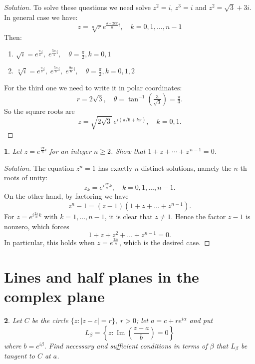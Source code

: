 \documentclass[12pt, a4paper]{report}
\theoremstyle{spaced}
\newtheorem{exercise}{}
\newcommand{\setexercise}[1]{\setcounter{exercise}{#1-1}}
\begin{document}
\begin{proof}[Solution]
	To solve these questions we need solve \(z^2= i\), \(z^3 = i\) and
	\(z^2 = \sqrt{3} + 3i\). In general case we have:
	\[
		z = \sqrt[n]{r}e^{\frac{\theta + 2k\pi}{n}i}, \quad k=0,1,\dots,n-1
	\]
	Then:
	\begin{enumerate}
		\item \(\sqrt{i} = e^{\frac{\pi}{4} i},\; e^{\frac{5\pi}{4} i}, \quad \theta = \frac{\pi}{2}, k = 0, 1\)
		\item \(\sqrt[3]{i} = e^{\frac{\pi}{6} i},\; e^{\frac{5\pi}{6} i},
		      \; e^{\frac{9\pi}{6} i}, \quad \theta = \frac{\pi}{2}, k = 0, 1, 2\)
	\end{enumerate}

	For the third one we need to write it in polar coordinates:
	\[
		r =  2\sqrt{3}, \quad\theta = \tan^{-1}\!\left(\tfrac{3}{\sqrt{3}}\right) = \tfrac{\pi}{3}.
	\]
	So the square roots are
	\[
		z = \sqrt{2\sqrt{3}} \, e^{i(\pi/6 + k\pi)}, \quad k=0,1.
	\]

\end{proof}

\setexercise{5}
\begin{exercise}
	Let  \(z = e^{\tfrac{2\pi}{n}i}\) for an integer $n \geq 2$.
	Show that $1 + z + \cdots + z^{\,n-1} = 0$.
\end{exercise}


\begin{proof}[Solution]
	The equation \(z^n = 1\) has exactly \(n\) distinct solutions, namely the \(n\)-th roots of unity:
	\[
		z_k = e^{i \frac{2\pi}{n}k}, \quad k = 0, 1, \dots, n-1.
	\]
	On the other hand, by factoring we have
	\[
		z^n - 1 = (z - 1)(1 + z + \dots + z^{n-1}).
	\]
	For \(z = e^{i \frac{2\pi}{n}k}\) with \(k = 1, \dots, n-1\), it is clear that \(z \neq 1\). Hence the factor \(z - 1\) is nonzero, which forces
	\[
		1 + z + z^2 + \dots + z^{n-1} = 0.
	\]
	In particular, this holds when \(z = e^{\tfrac{2\pi i}{n}}\), which is the desired case.
\end{proof}

\section{Lines and half planes in the complex plane}
\setexercise{1}
\begin{exercise}
	Let $C$ be the circle $\{ z : |z - c| = r \}, \; r > 0$; let
	\(
	a = c + re^{i\alpha}
	\)
	and put
	\[
		L_{\beta} = \left\{ z : \operatorname{Im}\!\left( \frac{z - a}{b} \right) = 0 \right\}
	\]
	where $b = e^{i\beta}$. Find necessary and sufficient conditions in terms of $\beta$ that $L_{\beta}$ be tangent to $C$ at $a$.

\end{exercise}
\end{document}
